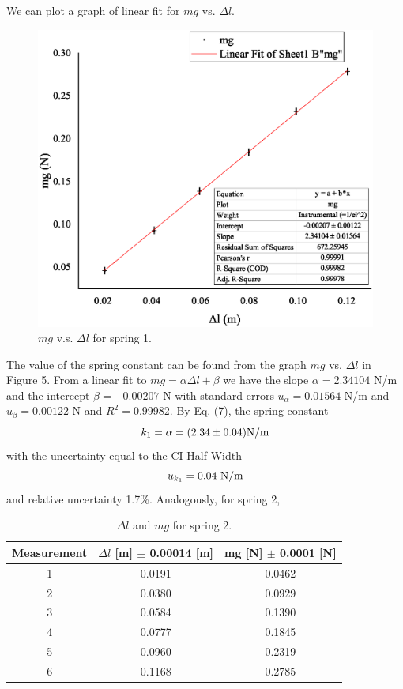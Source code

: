 \documentclass[a4paper]{report}
\begin{document}
	We can plot a graph of linear fit for $mg$ vs. $\Delta l$.
	\begin{figure}[H]
		\centering
		\includegraphics[width=1\linewidth]{5.eps}
		\caption{$mg$ v.s. $\Delta l$ for spring 1.}
	\end{figure}
	The value of the spring constant can be found from the graph $mg$ vs. $\Delta l$ in Figure 5. From a linear fit to $mg=\alpha\Delta l+\beta$ we have the slope $\alpha=2.34104$ N/m and the intercept $\beta=-0.00207$ N with standard errors $u_{\alpha}=0.01564$ N/m and $u_{\beta}=0.00122$ N and $R^2=0.99982$. By Eq. (7), the spring constant
	\begin{equation*}
	k_1=\alpha=(2.34\pm0.04)\rm{N/m}
	\end{equation*}
	with the uncertainty equal to the CI Half-Width
	\begin{equation*}
	u_{k_1}=0.04\ \rm{N/m}
	\end{equation*}
	and relative uncertainty 1.7\%.
	Analogously, for spring 2,
	\begin{table}[H]
		\centering
		\begin{tabular}{|c|c|c|}
			\hline
			Measurement&$\Delta l$ [m] $\pm$ 0.00014 [m]&mg [N] $\pm$ 0.0001 [N]\\
			\hline
			1&0.0191&0.0462\\
			\hline
			2&0.0380&0.0929\\
			\hline
			3&0.0584&0.1390\\
			\hline
			4&0.0777&0.1845\\
			\hline
			5&0.0960&0.2319\\
			\hline
			6&0.1168&0.2785\\
			\hline
		\end{tabular}
	\caption{$\Delta l$ and $mg$ for spring 2.}
	\end{table}
\end{document}
